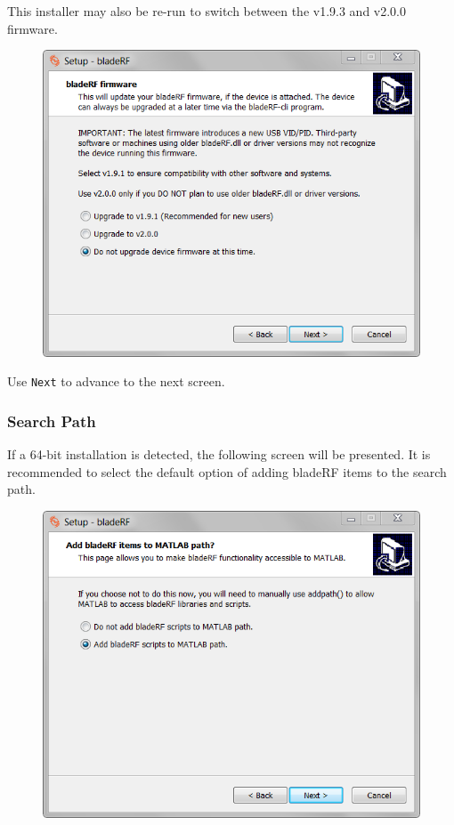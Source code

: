 {This installer may also be re-run to switch between the v1.9.3 and v2.0.0 firmware.

\begin{figure}[h]
  \centering
  \includegraphics{images/windows/installer/04-fwupgrade.png}
\end{figure}

Use \texttt{Next} to advance to the next screen.

\newpage
\subsubsection{\matlab Search Path} \label{sec:matlabsearchpath}

If a 64-bit \matlab installation is detected, the following screen will be
presented. It is recommended to select the default option of adding
bladeRF items to the \matlab search path.

\begin{figure}[h]
  \centering
  \includegraphics{images/windows/installer/05-matlabpath.png}
\end{figure}

}
